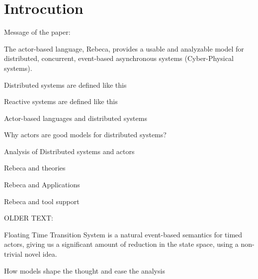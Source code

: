 \section{Introcution} \label{sec::introduction}


Message of the paper:

The actor-based language, Rebeca, provides a usable and analyzable model for distributed, concurrent, event-based asynchronous systems (Cyber-Physical systems).

Distributed systems  are defined like this

Reactive systems are defined like this

Actor-based languages and distributed systems

Why actors are good models for distributed systems?

Analysis of Distributed systems and actors

Rebeca and theories

Rebeca and Applications

Rebeca and tool support

OLDER TEXT:

Floating Time Transition System is a natural event-based semantics for timed actors, giving us a significant amount of reduction in the state space, using a non-trivial novel idea.
	
How models shape the thought and ease the analysis